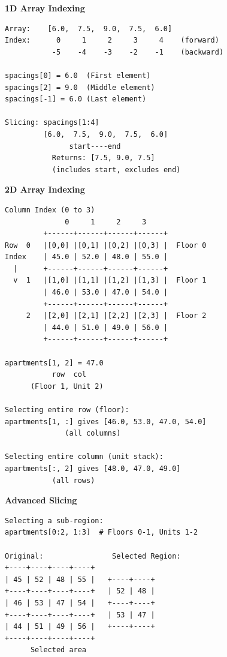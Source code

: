 \begin{tcolorbox}[
    title=Visual Guide to Array Indexing,
    colframe=purple,
    colback = white,
    arc=2mm
]
\textbf{1D Array Indexing}
\begin{lstlisting}[basicstyle=\ttfamily\footnotesize,breaklines=true,columns=fullflexible,keepspaces=true,xleftmargin=0pt]
Array:    [6.0,  7.5,  9.0,  7.5,  6.0]
Index:      0     1     2     3     4    (forward)
           -5    -4    -3    -2    -1    (backward)

spacings[0] = 6.0  (First element)
spacings[2] = 9.0  (Middle element)  
spacings[-1] = 6.0 (Last element)

Slicing: spacings[1:4]
         [6.0,  7.5,  9.0,  7.5,  6.0]
               start----end
           Returns: [7.5, 9.0, 7.5]
           (includes start, excludes end)

\end{lstlisting}

\textbf{2D Array Indexing}
\begin{lstlisting}[basicstyle=\ttfamily\footnotesize,breaklines=true,columns=fullflexible,keepspaces=true,xleftmargin=0pt]
                Column Index (0 to 3)
              0     1     2     3
         +------+------+------+------+
Row  0   |[0,0] |[0,1] |[0,2] |[0,3] |  Floor 0
Index    | 45.0 | 52.0 | 48.0 | 55.0 |
  |      +------+------+------+------+
  v  1   |[1,0] |[1,1] |[1,2] |[1,3] |  Floor 1
         | 46.0 | 53.0 | 47.0 | 54.0 |
         +------+------+------+------+
     2   |[2,0] |[2,1] |[2,2] |[2,3] |  Floor 2
         | 44.0 | 51.0 | 49.0 | 56.0 |
         +------+------+------+------+

apartments[1, 2] = 47.0
           row  col
      (Floor 1, Unit 2)

Selecting entire row (floor):
apartments[1, :] gives [46.0, 53.0, 47.0, 54.0]
              (all columns)

Selecting entire column (unit stack):
apartments[:, 2] gives [48.0, 47.0, 49.0]
           (all rows)

\end{lstlisting}

\textbf{Advanced Slicing}
\begin{lstlisting}[basicstyle=\ttfamily\footnotesize,breaklines=true,columns=fullflexible,keepspaces=true,xleftmargin=0pt]
Selecting a sub-region:
apartments[0:2, 1:3]  # Floors 0-1, Units 1-2

Original:                Selected Region:
+----+----+----+----+   
| 45 | 52 | 48 | 55 |   +----+----+
+----+----+----+----+   | 52 | 48 |
| 46 | 53 | 47 | 54 |   +----+----+
+----+----+----+----+   | 53 | 47 |
| 44 | 51 | 49 | 56 |   +----+----+
+----+----+----+----+
      Selected area

\end{lstlisting}
\end{tcolorbox}

